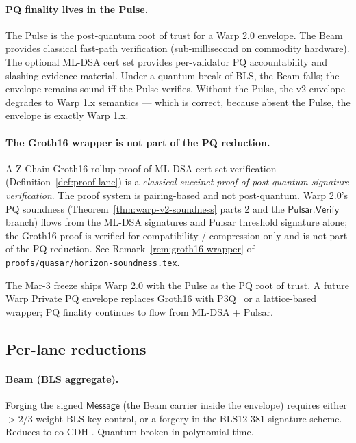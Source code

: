 \paragraph{PQ finality lives in the Pulse.} The Pulse is the post-quantum root of trust for a Warp 2.0 envelope. The Beam provides classical fast-path verification (sub-millisecond on commodity hardware). The optional ML-DSA cert set provides per-validator PQ accountability and slashing-evidence material. Under a quantum break of BLS, the Beam falls; the envelope remains sound iff the Pulse verifies. Without the Pulse, the v2 envelope degrades to Warp 1.x semantics --- which is correct, because absent the Pulse, the envelope is exactly Warp 1.x.

\paragraph{The Groth16 wrapper is not part of the PQ reduction.}

\begin{remark}
\label{rem:groth16-wrapper-warp}
A Z-Chain Groth16 rollup proof of ML-DSA cert-set verification (Definition~\ref{def:proof-lane}) is a \emph{classical succinct proof of post-quantum signature verification}. The proof system is pairing-based and not post-quantum. Warp 2.0's PQ soundness (Theorem~\ref{thm:warp-v2-soundness} parts 2 and the $\mathsf{Pulsar.Verify}$ branch) flows from the ML-DSA signatures and Pulsar threshold signature alone; the Groth16 proof is verified for compatibility / compression only and is not part of the PQ reduction. See Remark~\ref{rem:groth16-wrapper} of \texttt{proofs/quasar/horizon-soundness.tex}.
\end{remark}

The Mar-3 freeze ships Warp 2.0 with the Pulse as the PQ root of trust. A future Warp Private PQ envelope replaces Groth16 with P3Q~\cite{luxp3q} or a lattice-based wrapper; PQ finality continues to flow from ML-DSA + Pulsar.

\subsection{Per-lane reductions}

\paragraph{Beam (BLS aggregate).} Forging the signed $\mathsf{Message}$ (the Beam carrier inside the envelope) requires either $> 2/3$-weight BLS-key control, or a forgery in the BLS12-381 signature scheme. Reduces to co-CDH \cite{boneh2001short}. Quantum-broken in polynomial time.

